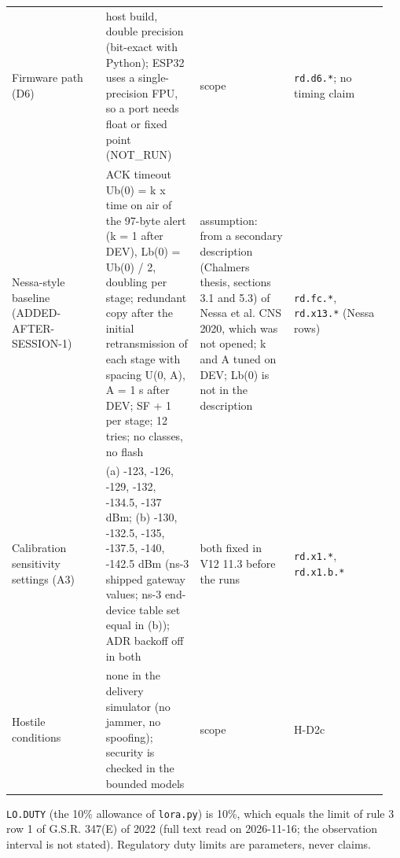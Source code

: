 {\begin{longtable}{p{0.237\linewidth}p{0.237\linewidth}p{0.237\linewidth}p{0.237\linewidth}}
Firmware path (D6) & host build, double precision (bit-exact with Python); ESP32 uses a single-precision FPU, so a port needs float or fixed point (NOT\_RUN) & scope & \texttt{rd.d6.*}; no timing claim \\
Nessa-style baseline (ADDED-AFTER-SESSION-1) & ACK timeout Ub(0) = k x time on air of the 97-byte alert (k = 1 after DEV), Lb(0) = Ub(0) / 2, doubling per stage; redundant copy after the initial retransmission of each stage with spacing U(0, A), A = 1 s after DEV; SF + 1 per stage; 12 tries; no classes, no flash & assumption: from a secondary description (Chalmers thesis, sections 3.1 and 5.3) of Nessa et al. CNS 2020, which was not opened; k and A tuned on DEV; Lb(0) is not in the description & \texttt{rd.fc.*}, \texttt{rd.x13.*} (Nessa rows) \\
Calibration sensitivity settings (A3) & (a) -123, -126, -129, -132, -134.5, -137 dBm; (b) -130, -132.5, -135, -137.5, -140, -142.5 dBm (ns-3 shipped gateway values; ns-3 end-device table set equal in (b)); ADR backoff off in both & both fixed in V12 11.3 before the runs & \texttt{rd.x1.*}, \texttt{rd.x1.b.*} \\
Hostile conditions & none in the delivery simulator (no jammer, no spoofing); security is checked in the bounded models & scope & H-D2c \\
\bottomrule
\end{longtable}}

\texttt{LO.DUTY} (the 10\% allowance of \texttt{lora.py}) is 10\%, which equals the limit of rule 3 row 1 of G.S.R. 347(E) of 2022 (full text read on 2026-11-16; the observation interval is not stated). Regulatory duty limits are parameters, never claims.


